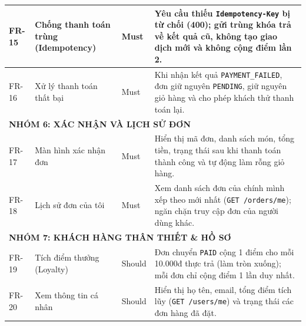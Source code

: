 \begin{longtable}{|p{}|p{}|p{}|p{}|}
\hline
FR-15 & Chống thanh toán trùng (Idempotency) & Must & Yêu cầu thiếu \texttt{Idempotency-Key} bị từ chối (400); gửi trùng khóa trả về kết quả cũ, không tạo giao dịch mới và không cộng điểm lần 2. \\
\hline
FR-16 & Xử lý thanh toán thất bại & Must & Khi nhận kết quả \texttt{PAYMENT\_FAILED}, đơn giữ nguyên \texttt{PENDING}, giữ nguyên giỏ hàng và cho phép khách thử thanh toán lại. \\
\hline
\multicolumn{4}{|l|}{\textbf{NHÓM 6: XÁC NHẬN VÀ LỊCH SỬ ĐƠN}} \\
\hline
FR-17 & Màn hình xác nhận đơn & Must & Hiển thị mã đơn, danh sách món, tổng tiền, trạng thái sau khi thanh toán thành công và tự động làm rỗng giỏ hàng. \\
\hline
FR-18 & Lịch sử đơn của tôi & Must & Xem danh sách đơn của chính mình xếp theo mới nhất (\texttt{GET /orders/me}); ngăn chặn truy cập đơn của người dùng khác. \\
\hline
\multicolumn{4}{|l|}{\textbf{NHÓM 7: KHÁCH HÀNG THÂN THIẾT \& HỒ SƠ}} \\
\hline
FR-19 & Tích điểm thưởng (Loyalty) & Should & Đơn chuyển \texttt{PAID} cộng 1 điểm cho mỗi 10.000đ thực trả (làm tròn xuống); mỗi đơn chỉ cộng điểm 1 lần duy nhất. \\
\hline
FR-20 & Xem thông tin cá nhân & Should & Hiển thị họ tên, email, tổng điểm tích lũy (\texttt{GET /users/me}) và trạng thái các đơn hàng đã đặt. \\
\hline
\end{longtable}
\normalsize

